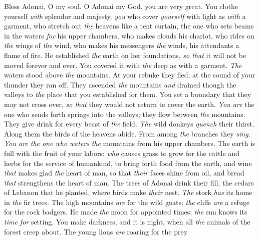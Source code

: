 \begin{biblechapter} %
 Bless Adonai, O my soul. 
O Adonai my God, you are very great. 
You clothe yourself \textit{with} splendor and majesty,
\verse \textit{you} who cover \textit{yourself} with light as \textit{with} a garment, 
who stretch out \textit{the} heavens like a tent curtain,
\verse the one who sets beams in the waters \textit{for} his upper chambers, 
who makes clouds his chariot, 
who rides on \textit{the} wings of \textit{the} wind,
\verse who makes his messengers \textit{the} winds, 
his attendants a flame of fire.
\verse He established \textit{the} earth on her foundations, 
\textit{so that} it will not be moved forever and ever.
\verse You covered it with \textit{the} deep as with a garment. 
\textit{The} waters stood above \textit{the} mountains.
\verse At your rebuke they fled; 
at the sound of your thunder they ran off.
\verse They ascended \textit{the} mountains \textit{and} drained though the valleys 
to \textit{the} place that you established for them.
\verse You set a boundary that they may not cross over, 
\textit{so that} they would not return to cover the earth.
\verse \textit{You are} the one who sends forth springs into the valleys; 
they flow between \textit{the} mountains.
\verse They give drink for every beast of \textit{the} field. 
\textit{The} wild donkeys \textit{quench} their thirst.
\verse Along them the birds of the heavens abide. 
From among \textit{the} branches they \textit{sing}.
\verse \textit{You are the one who} \textit{waters} \textit{the} mountains 
from his upper chambers. 
The earth is full with the fruit of your labors:
\verse \textit{who} causes grass to grow for the cattle 
and herbs for the service of humankind, 
to bring forth food from the earth,
\verse and wine \textit{that} makes glad \textit{the} heart of man, 
so that \textit{their} faces shine from oil, 
and bread \textit{that} strengthens the heart of man.
\verse The trees of Adonai drink their fill, 
the cedars of Lebanon that he planted,
\verse where birds make \textit{their} nest. 
\textit{The} stork \textit{has} its home in \textit{the} fir trees.
\verse The high mountains \textit{are} for the wild goats; 
\textit{the} cliffs \textit{are} a refuge for the rock badgers.
\verse He made \textit{the} moon for appointed times; 
\textit{the} sun knows its \textit{time for} setting.
\verse You make darkness, and it is night, 
when all \textit{the} animals of the forest creep about.
\verse The young lions \textit{are} roaring for the prey 

\end{biblechapter}
